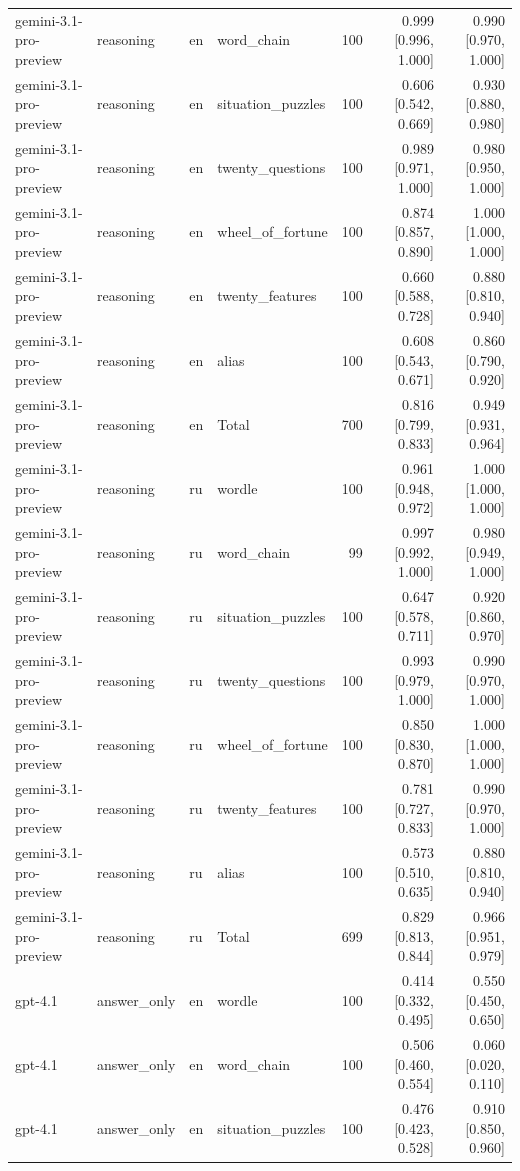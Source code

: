 \begin{longtable}{llllrrr}
gemini-3.1-pro-preview & reasoning & en & word\_chain & 100 & 0.999 [0.996, 1.000] & 0.990 [0.970, 1.000] \\
gemini-3.1-pro-preview & reasoning & en & situation\_puzzles & 100 & 0.606 [0.542, 0.669] & 0.930 [0.880, 0.980] \\
gemini-3.1-pro-preview & reasoning & en & twenty\_questions & 100 & 0.989 [0.971, 1.000] & 0.980 [0.950, 1.000] \\
gemini-3.1-pro-preview & reasoning & en & wheel\_of\_fortune & 100 & 0.874 [0.857, 0.890] & 1.000 [1.000, 1.000] \\
gemini-3.1-pro-preview & reasoning & en & twenty\_features & 100 & 0.660 [0.588, 0.728] & 0.880 [0.810, 0.940] \\
gemini-3.1-pro-preview & reasoning & en & alias & 100 & 0.608 [0.543, 0.671] & 0.860 [0.790, 0.920] \\
gemini-3.1-pro-preview & reasoning & en & Total & 700 & 0.816 [0.799, 0.833] & 0.949 [0.931, 0.964] \\
gemini-3.1-pro-preview & reasoning & ru & wordle & 100 & 0.961 [0.948, 0.972] & 1.000 [1.000, 1.000] \\
gemini-3.1-pro-preview & reasoning & ru & word\_chain & 99 & 0.997 [0.992, 1.000] & 0.980 [0.949, 1.000] \\
gemini-3.1-pro-preview & reasoning & ru & situation\_puzzles & 100 & 0.647 [0.578, 0.711] & 0.920 [0.860, 0.970] \\
gemini-3.1-pro-preview & reasoning & ru & twenty\_questions & 100 & 0.993 [0.979, 1.000] & 0.990 [0.970, 1.000] \\
gemini-3.1-pro-preview & reasoning & ru & wheel\_of\_fortune & 100 & 0.850 [0.830, 0.870] & 1.000 [1.000, 1.000] \\
gemini-3.1-pro-preview & reasoning & ru & twenty\_features & 100 & 0.781 [0.727, 0.833] & 0.990 [0.970, 1.000] \\
gemini-3.1-pro-preview & reasoning & ru & alias & 100 & 0.573 [0.510, 0.635] & 0.880 [0.810, 0.940] \\
gemini-3.1-pro-preview & reasoning & ru & Total & 699 & 0.829 [0.813, 0.844] & 0.966 [0.951, 0.979] \\
gpt-4.1 & answer\_only & en & wordle & 100 & 0.414 [0.332, 0.495] & 0.550 [0.450, 0.650] \\
gpt-4.1 & answer\_only & en & word\_chain & 100 & 0.506 [0.460, 0.554] & 0.060 [0.020, 0.110] \\
gpt-4.1 & answer\_only & en & situation\_puzzles & 100 & 0.476 [0.423, 0.528] & 0.910 [0.850, 0.960] \\

\end{longtable}
